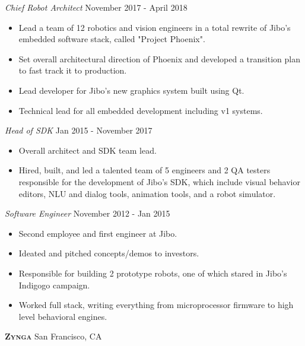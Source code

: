 \documentclass[a4paper]{article}
\begin{document}
\begin{addmargin}[1em]{0em}
\begin{itemize}
    \end{itemize}
    \textit{Chief Robot Architect} \hfill November 2017 - April 2018\\
    \vspace{-1mm}
    \begin{itemize} \itemsep 1pt
        \item Lead a team of 12 robotics and vision engineers in a total rewrite of 
            Jibo's embedded software stack, called "Project Phoenix".
        \item Set overall architectural direction of Phoenix and developed
            a transition plan to fast track it to production.
        \item Lead developer for Jibo's new graphics system built using Qt.
        \item Technical lead for all embedded development including v1 systems.
    \end{itemize}
    \textit{Head of SDK} \hfill Jan 2015 - November 2017\\
    \vspace{-1mm}
    \begin{itemize} \itemsep 1pt
        \item Overall architect and SDK team lead.
        \item Hired, built, and led a talented team of 5 engineers and 2 QA testers 
        responsible for the development of Jibo’s SDK, which include visual behavior editors, 
        NLU and dialog tools, animation tools, and a robot simulator.
    \end{itemize}
    \textit{Software Engineer} \hfill November 2012 - Jan 2015\\
    \vspace{-1mm}
    \begin{itemize} \itemsep 1pt
        \item Second employee and first engineer at Jibo.
        \item Ideated and pitched concepts/demos to investors.
        \item Responsible for building 2 prototype robots, one of which stared in Jibo's
            Indigogo campaign.
        \item Worked full stack, writing everything from microprocessor firmware to 
            high level behavioral engines.
    \end{itemize}
\end{addmargin}

\textbf{\textsc{Zynga}} \hfill San Francisco, CA\\
\vspace{2mm}
\end{document}
